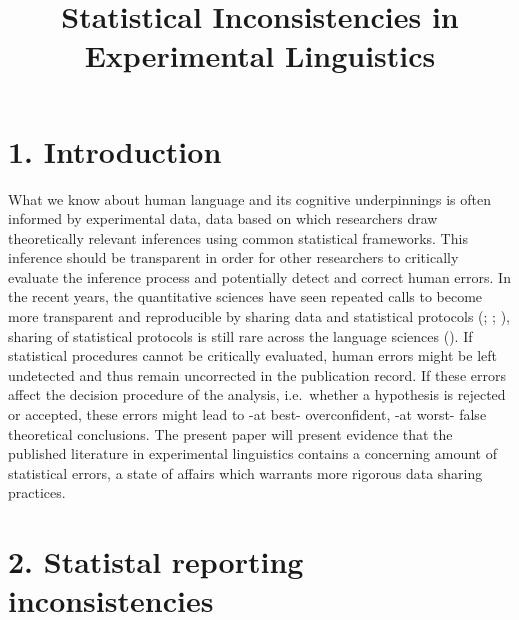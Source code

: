 \documentclass[
  doc,
  longtable,
  nolmodern,
  notxfonts,
  notimes,
  colorlinks=true,linkcolor=blue,citecolor=blue,urlcolor=blue]{apa7}
\title{Statistical Inconsistencies in Experimental Linguistics}
\affiliation{
{Department of Linguistics \& Scandinavian Studies, University of Oslo}}
\begin{document}
\maketitle


\setcounter{secnumdepth}{-\maxdimen} %

\setlength\LTleft{0pt}


\section{1. Introduction}\label{introduction}

What we know about human language and its cognitive underpinnings is
often informed by experimental data, data based on which researchers
draw theoretically relevant inferences using common statistical
frameworks. This inference should be transparent in order for other
researchers to critically evaluate the inference process and potentially
detect and correct human errors. In the recent years, the quantitative
sciences have seen repeated calls to become more transparent and
reproducible by sharing data and statistical protocols
(;
;
), sharing of
statistical protocols is still rare across the language sciences
(). If
statistical procedures cannot be critically evaluated, human errors
might be left undetected and thus remain uncorrected in the publication
record. If these errors affect the decision procedure of the analysis,
i.e.~whether a hypothesis is rejected or accepted, these errors might
lead to -at best- overconfident, -at worst- false theoretical
conclusions. The present paper will present evidence that the published
literature in experimental linguistics contains a concerning amount of
statistical errors, a state of affairs which warrants more rigorous data
sharing practices.

\section{2. Statistal reporting
inconsistencies}\label{statistal-reporting-inconsistencies}
\end{document}
